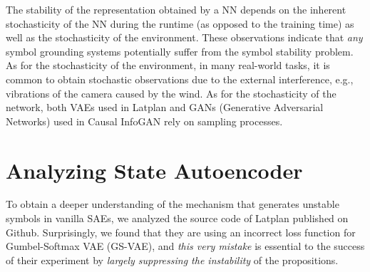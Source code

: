 
The stability of the representation obtained by a NN depends
on
the inherent stochasticity of the NN during the runtime (as opposed to the training time) as well as
the stochasticity of the environment.
% 
These observations indicate that \emph{any} symbol grounding systems potentially suffer from 
the symbol stability problem.
% 
As for the stochasticity of the environment,
in many real-world tasks, it is common to obtain stochastic observations
due to the external interference, e.g., vibrations of the camera caused by the wind.
% 
As for the stochasticity of the network,
both
VAEs \cite{kingma2013auto,jang2016categorical,higgins2016beta} used in Latplan
and
GANs (Generative Adversarial Networks) \cite{goodfellow2014generative} used in Causal InfoGAN \cite{kurutach2018learning}
rely on sampling processes.

\section{Analyzing State Autoencoder}
\label{analysis}

To obtain a deeper understanding of the mechanism that generates
unstable symbols in vanilla SAEs, we
analyzed the source code of Latplan published on Github.
% 
Surprisingly, we found that they are using an incorrect loss function for Gumbel-Softmax VAE (GS-VAE),
and \emph{this very mistake} is essential to the success of their experiment
by \emph{largely suppressing the instability} of the propositions.


